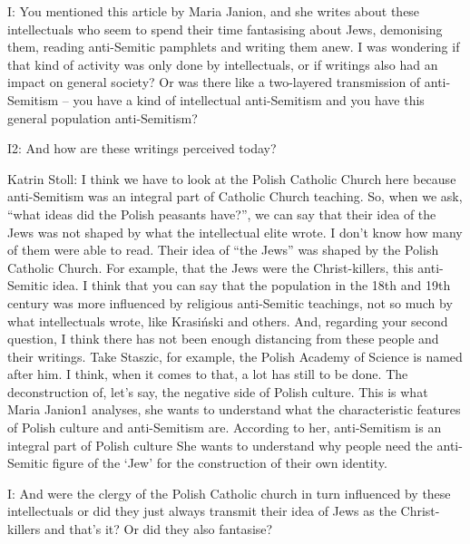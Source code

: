 

I: You mentioned this article by Maria Janion, and she writes about these intellectuals who seem to spend their time fantasising about Jews, demonising them, reading anti-Semitic pamphlets and writing them anew. I was wondering if that kind of activity was only done by intellectuals, or if writings also had an impact on general society? Or was there like a two-layered transmission of anti-Semitism – you have a kind of intellectual anti-Semitism and you have this general population anti-Semitism? 

I2: And how are these writings perceived today? 

 

Katrin Stoll: I think we have to look at the Polish Catholic Church here because anti-Semitism was an integral part of Catholic Church teaching. So, when we ask, “what ideas did the Polish peasants have?”, we can say that their idea of the Jews was not shaped by what the intellectual elite wrote. I don’t know how many of them were able to read. Their idea of “the Jews” was shaped by the Polish Catholic Church. For example, that the Jews were the Christ-killers, this anti-Semitic idea. I think that you can say that the population in the 18th and 19th century was more influenced by religious anti-Semitic teachings, not so much by what intellectuals wrote, like Krasiński and others. And, regarding your second question, I think there has not been enough distancing from these people and their writings. Take Staszic, for example, the Polish Academy of Science is named after him. I think, when it comes to that, a lot has still to be done. The deconstruction of, let’s say, the negative side of Polish culture. This is what Maria Janion1 analyses, she wants to understand what the characteristic features of Polish culture and anti-Semitism are. According to her, anti-Semitism is an integral part of Polish culture She wants to understand why people need the anti-Semitic figure of the ‘Jew’ for the construction of their own identity. 

 

I: And were the clergy of the Polish Catholic church in turn influenced by these intellectuals or did they just always transmit their idea of Jews as the Christ-killers and that’s it? Or did they also fantasise? 

 

